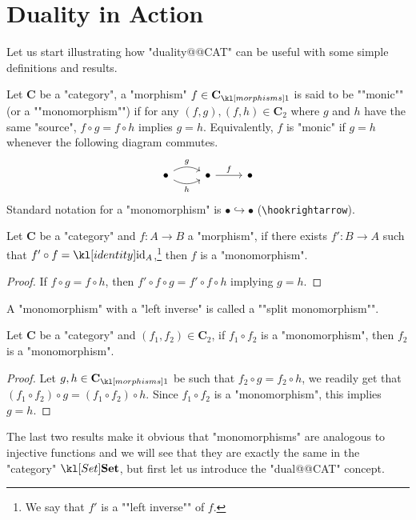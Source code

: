 \documentclass[main.tex]{subfiles}
\begin{document}
\section{Duality in Action}
Let us start illustrating how "duality@@CAT" can be useful with some simple definitions and results.
\begin{defn}[Monomorphism]
	\AP Let $\mathbf{C}$ be a "category", a "morphism" $f \in \mor{\mathbf{C}}$ is said to be ""monic"" (or a ""monomorphism"") if for any $(f,g), (f,h) \in \mathbf{C}_2$ where $g$ and $h$ have the same "source", $f\circ g = f\circ h$ implies $g = h$. Equivalently, $f$ is "monic" if $g = h$ whenever the following diagram commutes.%
	\begin{equation}
		\begin{tikzcd}
		\bullet \arrow[r, "h"', bend right] \arrow[r, "g", bend left] & \bullet \arrow[r, "f"] & \bullet
		\end{tikzcd}
	\end{equation}
	Standard notation for a "monomorphism" is $ \bullet \hookrightarrow \bullet $ (\verb!\hookrightarrow!).
\end{defn}
\begin{prop}\label{prop:mon1}
	Let $\mathbf{C}$ be a "category" and $f:A\rightarrow B$ a "morphism", if there exists $f': B\rightarrow A$ such that $f'\circ f = \id_A$,\footnote{\AP We say that $f'$ is a ""left inverse"" of $f$.} then $f$ is a "monomorphism".
\end{prop}
\begin{proof}
	If $f\circ g = f\circ h$, then $f'\circ f \circ g = f'\circ f \circ h$ implying $g = h$.
\end{proof}
\AP A "monomorphism" with a "left inverse" is called a ""split monomorphism"".
\begin{prop}\label{prop:mon2}
	Let $\mathbf{C}$ be a "category" and $(f_1, f_2) \in \mathbf{C}_2$, if $f_1 \circ f_2$ is a "monomorphism", then $f_2$ is a "monomorphism".
\end{prop}
\begin{proof}
	Let $g,h \in \mor{\mathbf{C}}$ be such that $f_2\circ g = f_2\circ h$, we readily get that $(f_1\circ f_2)\circ g = (f_1 \circ f_2) \circ h$. Since $f_1\circ f_2$ is a "monomorphism", this implies $g = h$.
\end{proof}
The last two results make it obvious that "monomorphisms" are analogous to injective functions and we will see that they are exactly the same in the "category" $\catSet$, but first let us introduce the "dual@@CAT" concept. 
\end{document}
